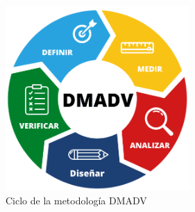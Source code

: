 \begin{figure} [H]
    \begin{center}
      \includegraphics[width=7cm]{figs/DMADV.png}
    \end{center}
    \caption{Ciclo de la metodología DMADV}
    \label{fig:DMADV}
\end{figure}
\pagebreak
	
